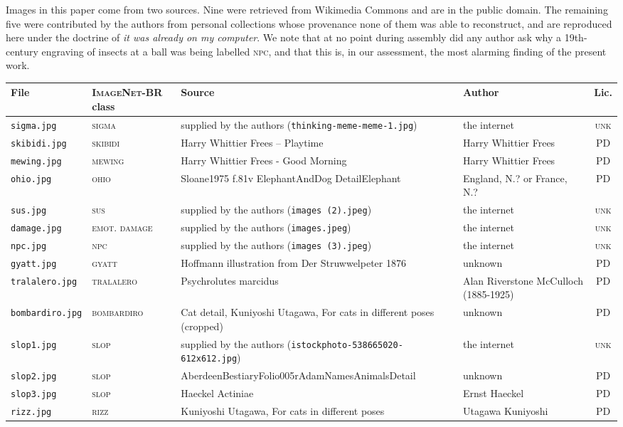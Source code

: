 \documentclass[10pt]{article}
\newcommand{\br}{\textsc{ImageNet-BR}}
\begin{document}
Images in this paper come from two sources. Nine were retrieved from Wikimedia
Commons and are in the public domain. The remaining five were contributed by
the authors from personal collections whose provenance none of them was able to
reconstruct, and are reproduced here under the doctrine of \emph{it was already
on my computer}. We note that at no point during assembly did any author ask
why a 19th-century engraving of insects at a ball was being labelled
\textsc{npc}, and that this is, in our assessment, the most alarming finding of
the present work.

\begin{table}[h]
\centering
\scriptsize
\setlength{\tabcolsep}{4pt}
\begin{tabular}{@{}ll>{\raggedright\arraybackslash}p{5.9cm}>{\raggedright\arraybackslash}p{2.7cm}c@{}}
\toprule
File & \br{} class & Source & Author & Lic. \\
\midrule
\texttt{sigma.jpg} & \textsc{sigma} & supplied by the authors (\texttt{thinking-meme-meme-1.jpg}) & the internet & \textsc{unk} \\
\texttt{skibidi.jpg} & \textsc{skibidi} & Harry Whittier Frees -- Playtime & Harry Whittier Frees & PD \\
\texttt{mewing.jpg} & \textsc{mewing} & Harry Whittier Frees - Good Morning & Harry Whittier Frees & PD \\
\texttt{ohio.jpg} & \textsc{ohio} & Sloane1975 f.81v ElephantAndDog DetailElephant & England, N.? or France, N.? & PD \\
\texttt{sus.jpg} & \textsc{sus} & supplied by the authors (\texttt{images (2).jpeg}) & the internet & \textsc{unk} \\
\texttt{damage.jpg} & \textsc{emot. damage} & supplied by the authors (\texttt{images.jpeg}) & the internet & \textsc{unk} \\
\texttt{npc.jpg} & \textsc{npc} & supplied by the authors (\texttt{images (3).jpeg}) & the internet & \textsc{unk} \\
\texttt{gyatt.jpg} & \textsc{gyatt} & Hoffmann illustration from Der Struwwelpeter 1876 & unknown & PD \\
\texttt{tralalero.jpg} & \textsc{tralalero} & Psychrolutes marcidus & Alan Riverstone McCulloch (1885-1925) & PD \\
\texttt{bombardiro.jpg} & \textsc{bombardiro} & Cat detail, Kuniyoshi Utagawa, For cats in different poses (cropped) & unknown & PD \\
\texttt{slop1.jpg} & \textsc{slop} & supplied by the authors (\texttt{istockphoto-538665020-612x612.jpg}) & the internet & \textsc{unk} \\
\texttt{slop2.jpg} & \textsc{slop} & AberdeenBestiaryFolio005rAdamNamesAnimalsDetail & unknown & PD \\
\texttt{slop3.jpg} & \textsc{slop} & Haeckel Actiniae & Ernst Haeckel & PD \\
\texttt{rizz.jpg} & \textsc{rizz} & Kuniyoshi Utagawa, For cats in different poses & Utagawa Kuniyoshi & PD \\
\bottomrule
\end{tabular}
\end{table}
\end{document}
